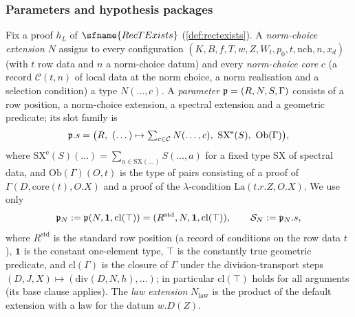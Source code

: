 \subsubsection{Parameters and hypothesis packages}

Fix a proof $h_L$ of $\sfname{RecTExists}$ (\cref{def:rectexists}). A \emph{norm-choice extension} $N$
assigns to every configuration $(K,B,f,T,w,Z,W_t,p_0,t,\mathrm{nch},n,x_d)$ (with $t$ row data and $n$ a
norm-choice datum) and every \emph{norm-choice core} $c$ (a record $\mathcal{C}(t,n)$ of local
data at the norm choice, a norm realisation and a selection condition) a type $N(\dots,c)$. A
\emph{parameter} $\mathfrak p=(R,N,S,\Gamma)$ consists of a row position, a norm-choice extension, a spectral
extension and a geometric predicate; its slot family is
\[
\baselatoneP.s=\bigl(R,\ (\dots)\mapsto\textstyle\sum_{c\in\mathcal{C}}N(\dots,c),\
\mathrm{SX}^{\mathrm e}(S),\ \mathrm{Ob}(\Gamma)\bigr),
\]
where $\mathrm{SX}^{\mathrm e}(S)(\dots)=\sum_{a\in\mathrm{SX}(\dots)}S(\dots,a)$ for a fixed type
$\mathrm{SX}$ of spectral data, and $\mathrm{Ob}(\Gamma)(O,t)$ is the type of pairs consisting of a proof of
$\Gamma(D,\mathrm{core}(t),O.X)$ and a proof of the $\lambda$-condition $\mathrm{La}(t.r.Z,O.X)$. We use only
\[
\mathfrak p_N:=\mathfrak{p}(N,\mathbf{1},\mathrm{cl}(\top))
=(R^{\mathrm{std}},N,\mathbf{1},\mathrm{cl}(\top)),\qquad
\mathcal S_N:=\mathfrak p_N.s,
\]
where $R^{\mathrm{std}}$ is the standard row position (a record of conditions on the row data $t$),
$\mathbf{1}$ is the constant one-element type, $\top$ is the constantly true geometric predicate, and
$\mathrm{cl}(\Gamma)$ is the closure of $\Gamma$ under the division-transport steps
$(D,J,X)\mapsto(\mathrm{div}(D,N,h),\dots)$; in particular $\mathrm{cl}(\top)$ holds for all arguments (its
base clause applies). The \emph{law extension} $N_{\mathrm{law}}$ is the product of the default extension with
a law for the datum $w.D(Z)$.


